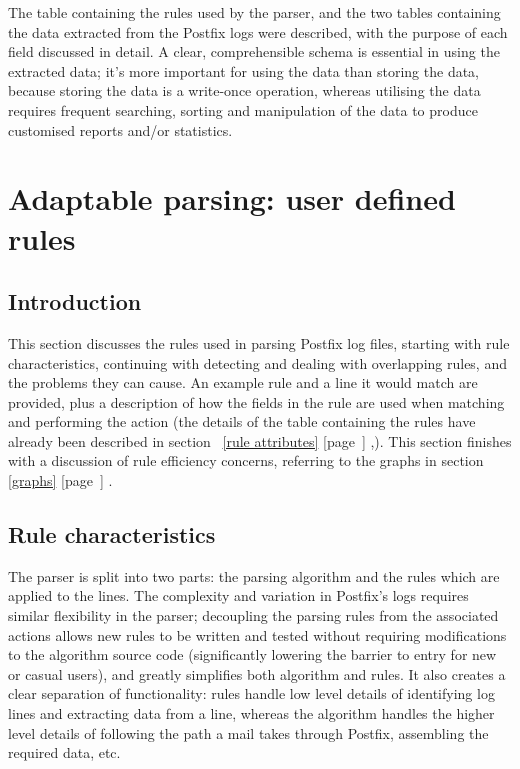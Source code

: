 \documentclass[a4paper,12pt,draft]{article}
\newcommand{\refwithpage}[1]{%
    \empty{}\ref{#1} [page~\pageref{#1}]%
}
\begin{document}
The table containing the rules used by the parser, and the two tables
containing the data extracted from the Postfix logs were described, with
the purpose of each field discussed in detail.  A clear, comprehensible
schema is essential in using the extracted data; it's more important for
using the data than storing the data, because storing the data is a
write-once operation, whereas utilising the data requires frequent
searching, sorting and manipulation of the data to produce customised
reports and/or statistics.

\section{Adaptable parsing: user defined rules}

\label{rules}

\subsection{Introduction}

This section discusses the rules used in parsing Postfix log files,
starting with rule characteristics, continuing with detecting and dealing
with overlapping rules, and the problems they can cause.  An example rule
and a line it would match are provided, plus a description of how the
fields in the rule are used when matching and performing the action (the
details of the table containing the rules have already been described in
section~\refwithpage{rule attributes},).  This section finishes with a
discussion of rule efficiency concerns, referring to the graphs in
section~\refwithpage{graphs}.


\subsection{Rule characteristics}

\label{rule characteristics}

The parser is split into two parts: the parsing algorithm and the rules
which are applied to the lines.  The complexity and variation in Postfix's
logs requires similar flexibility in the parser; decoupling the parsing
rules from the associated actions allows new rules to be written and tested
without requiring modifications to the algorithm source code (significantly
lowering the barrier to entry for new or casual users), and greatly
simplifies both algorithm and rules.  It also creates a clear separation of
functionality: rules handle low level details of identifying log lines and
extracting data from a line, whereas the algorithm handles the higher level
details of following the path a mail takes through Postfix, assembling the
required data, etc.
\end{document}
